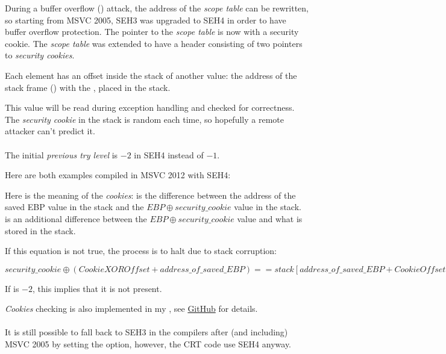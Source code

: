
\myindex{\BufferOverflow}
During a buffer overflow () attack, the address of the \emph{scope table} 
can be rewritten, so starting from MSVC 2005, SEH3 was upgraded to SEH4 in order to have buffer overflow protection.
The pointer to the \emph{scope table} is now  with a \gls{security cookie}.
The \emph{scope table} was extended to have a header consisting of two pointers to \emph{security cookies}.

Each element has an offset inside the stack of another value: 
the address of the \gls{stack frame} (\EBP)  with the  , placed in the stack.

This value will be read during exception handling and checked for correctness.
The \emph{security cookie} in the stack is random each time, so hopefully a remote attacker can't predict it. \\
\\
The initial \emph{previous try level} is $-2$ in SEH4 instead of $-1$.

\def\SEHfour{1}


Here are both examples compiled in MSVC 2012 with SEH4:





Here is the meaning of the \emph{cookies}:  
is the difference between the address of the saved EBP value in the stack
and the $EBP \oplus security\_cookie$ value in the stack.
 is an additional difference between the 
$EBP \oplus security\_cookie$ value and what is
stored in the stack.

If this equation is not true, the process is to halt due to stack corruption:

\begin{center}
$security\_cookie \oplus (CookieXOROffset + address\_of\_saved\_EBP) == stack[address\_of\_saved\_EBP + CookieOffset]$
\end{center}

If  is $-2$, this implies that it is not present.

\emph{Cookies} checking is also implemented in my \tracer{},
see \href{http://go.yurichev.com/17061}{GitHub} for details.\\
\\
It is still possible to fall back to SEH3 in the compilers after 
(and including) MSVC 2005 by setting the  option,
however, the \ac{CRT} code use SEH4 anyway.

